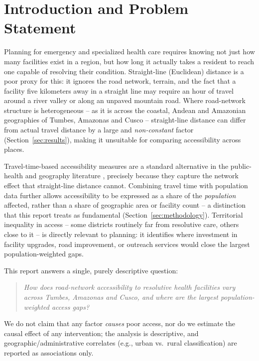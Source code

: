\section{Introduction and Problem Statement}

Planning for emergency and specialized health care requires knowing not just how many facilities exist in a region, but how long it actually takes a resident to reach one capable of resolving their condition. Straight-line (Euclidean) distance is a poor proxy for this: it ignores the road network, terrain, and the fact that a facility five kilometers away in a straight line may require an hour of travel around a river valley or along an unpaved mountain road. Where road-network structure is heterogeneous -- as it is across the coastal, Andean and Amazonian geographies of Tumbes, Amazonas and Cusco -- straight-line distance can differ from actual travel distance by a large and \emph{non-constant} factor (Section~\ref{sec:results}), making it unsuitable for comparing accessibility across places.

Travel-time-based accessibility measures are a standard alternative in the public-health and geography literature \citep{weiss2018global}, precisely because they capture the network effect that straight-line distance cannot. Combining travel time with population data further allows accessibility to be expressed as a share of the \emph{population} affected, rather than a share of geographic area or facility count -- a distinction that this report treats as fundamental (Section~\ref{sec:methodology}). Territorial inequality in access -- some districts routinely far from resolutive care, others close to it -- is directly relevant to planning: it identifies where investment in facility upgrades, road improvement, or outreach services would close the largest population-weighted gaps.

This report answers a single, purely descriptive question:

\begin{quote}
\emph{How does road-network accessibility to resolutive health facilities vary across Tumbes, Amazonas and Cusco, and where are the largest population-weighted access gaps?}
\end{quote}

We do not claim that any factor \emph{causes} poor access, nor do we estimate the causal effect of any intervention; the analysis is descriptive, and geographic/administrative correlates (e.g., urban vs.\ rural classification) are reported as associations only.

